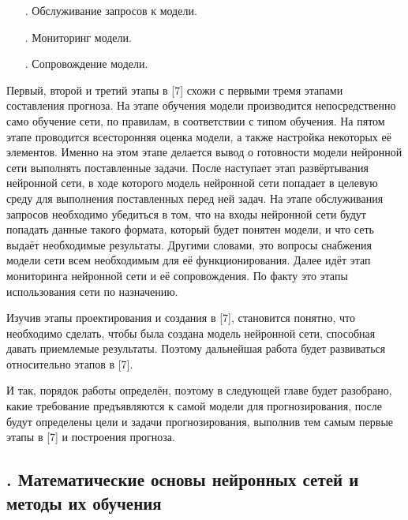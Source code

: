 {\begin{itemize}[leftmargin=2.15cm, labelwidth=0.65cm, labelsep=0.0cm]
		\item[\theitemcntr. ] Обслуживание запросов к модели.
		\addtocounter{itemcntr}{1}
		
		\item[\theitemcntr. ] Мониторинг модели.
		\addtocounter{itemcntr}{1}
		
		\item[\theitemcntr. ] Сопровождение модели. 
		\addtocounter{itemcntr}{1}
		
		\setcounter{itemcntr}{1}
	\end{itemize} 
	
	\par \redline Первый, второй и третий этапы в [7] схожи с первыми тремя этапами составления прогноза. На этапе обучения модели производится непосредственно само обучение сети, по правилам, в соответствии с типом обучения. На пятом этапе проводится всесторонняя оценка модели, а также настройка некоторых её элементов. Именно на этом этапе делается вывод о готовности модели нейронной сети выполнять поставленные задачи. После наступает этап развёртывания нейронной сети, в ходе которого модель нейронной сети попадает в целевую среду для выполнения поставленных перед ней задач. На этапе обслуживания запросов необходимо убедиться в том, что на входы нейронной сети будут попадать данные такого формата, который будет понятен модели, и что сеть выдаёт необходимые результаты. Другими словами, это вопросы снабжения модели сети всем необходимым для её функционирования. Далее идёт этап мониторинга нейронной сети и её сопровождения. По факту это этапы использования сети по назначению.    
	
	\par \redline Изучив этапы проектирования и создания в [7], становится понятно, что необходимо сделать, чтобы была создана модель нейронной сети, способная давать приемлемые результаты. Поэтому дальнейшая работа будет развиваться относительно этапов в [7].
	
	\par \redline И так, порядок работы определён, поэтому в следующей главе будет разобрано, какие требование предъявляются к самой модели для прогнозирования, после будут определены цели и задачи прогнозирования, выполнив тем самым первые этапы в [7] и построения прогноза.
	
	\par
}

\subtitlespace

\subsection*{
	\gostTitleFont
	\redline
	\thechaptercntr .\thesubchaptercntr \spc
	Математические основы нейронных сетей и методы их обучения
} \addtocounter{subchaptercntr}{1}

